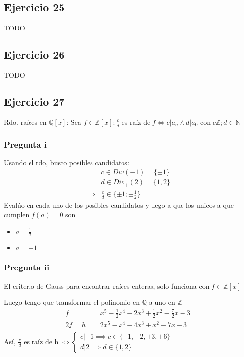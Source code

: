\subsection{Ejercicio 25}
TODO

\subsection{Ejercicio 26}
TODO

\subsection{Ejercicio 27}
Rdo. raíces en $ \mathbb{Q}[x] $: Sea $ f \in \mathbb{Z}[x]: \frac{c}{d} $ es raíz de $ f \iff c | a_n \wedge d|a_0 $ con $ c \mathbb{Z}; d \in \mathbb{N}   $

\subsubsection{Pregunta i}
Usando el rdo, busco posibles candidatos:
\begin{align*}
    &c \in Div(-1) = \{ \pm 1 \} \\
    &d \in Div_+(2) = \{ 1,2 \} \\
    \implies &\frac{c}{d} \in \{ \pm 1; \pm \frac{1}{2} \}
\end{align*}
Evalúo en cada uno de los posibles candidatos y llego a que los unicos a que cumplen $ f(a) = 0 $ son
\begin{itemize}
    \item $ a = \frac{1}{2} $
    \item $ a = -1 $
\end{itemize}
\subsubsection{Pregunta ii}

El criterio de Gauss para encontrar raíces enteras, solo funciona con $ f \in \mathbb{Z}[x] $

Luego tengo que transformar el polinomio en $ \mathbb{Q} $ a uno en $ \mathbb{Z} $,
\begin{align*}
    f &= x^5 - \frac{1}{2}x^4 - 2x^3 + \frac{1}{2}x^2 - \frac{7}{2}x - 3 \\
    2f = h &= 2x^5 - x^4 - 4x^3 + x^2 - 7x - 3 \\
\end{align*}
Así, $ \frac{c}{d} $ es raíz de h $ \iff \begin{cases}
    c|-6 \implies c \in \{ \pm 1, \pm 2, \pm 3, \pm 6 \} \\
    d|2 \implies d \in \{ 1,2 \}
\end{cases} $

